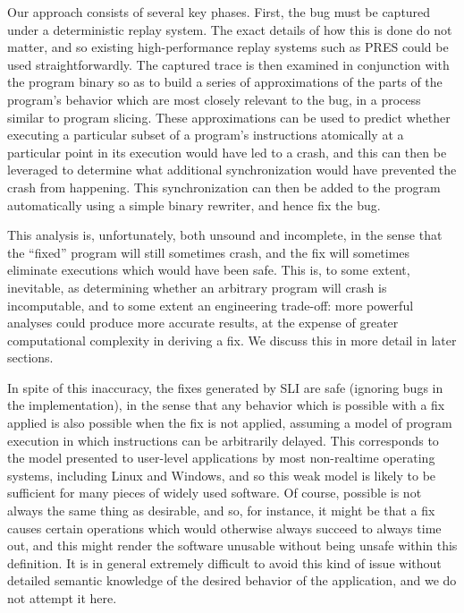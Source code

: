 \documentclass[10pt,twocolumn,preprint,natbib,authoryear]{sigplanconf}
\begin{document}
Our approach consists of several key phases.  First, the bug must be
captured under a deterministic replay system.  The exact details of
how this is done do not matter, and so existing high-performance
replay systems such as PRES\cite{Park2009} could be used
straightforwardly.  The captured trace is then examined in conjunction
with the program binary so as to build a series of approximations of
the parts of the program's behavior which are most closely relevant to
the bug, in a process similar to program slicing\cite{Weiser1979}.
These approximations can be used to predict whether executing a
particular subset of a program's instructions atomically at a
particular point in its execution would have led to a crash, and this
can then be leveraged to determine what additional synchronization
would have prevented the crash from happening.  This synchronization
can then be added to the program automatically using a simple binary
rewriter, and hence fix the bug.

This analysis is, unfortunately, both unsound and incomplete, in the
sense that the ``fixed'' program will still sometimes crash, and the
fix will sometimes eliminate executions which would have been safe.
This is, to some extent, inevitable, as determining whether an
arbitrary program will crash is incomputable, and to some extent an
engineering trade-off: more powerful analyses could produce more
accurate results, at the expense of greater computational complexity
in deriving a fix.  We discuss this in more detail in later sections.

In spite of this inaccuracy, the fixes generated by SLI are safe
(ignoring bugs in the implementation), in the sense that any behavior
which is possible with a fix applied is also possible when the fix is
not applied, assuming a model of program execution in which
instructions can be arbitrarily delayed.  This corresponds to the
model presented to user-level applications by most non-realtime
operating systems, including Linux and Windows, and so this weak model
is likely to be sufficient for many pieces of widely used software.
Of course, possible is not always the same thing as desirable, and so,
for instance, it might be that a fix causes certain operations which
would otherwise always succeed to always time out, and this might
render the software unusable without being unsafe within this
definition.  It is in general extremely difficult to avoid this kind
of issue without detailed semantic knowledge of the desired behavior
of the application, and we do not attempt it here.
\end{document}
